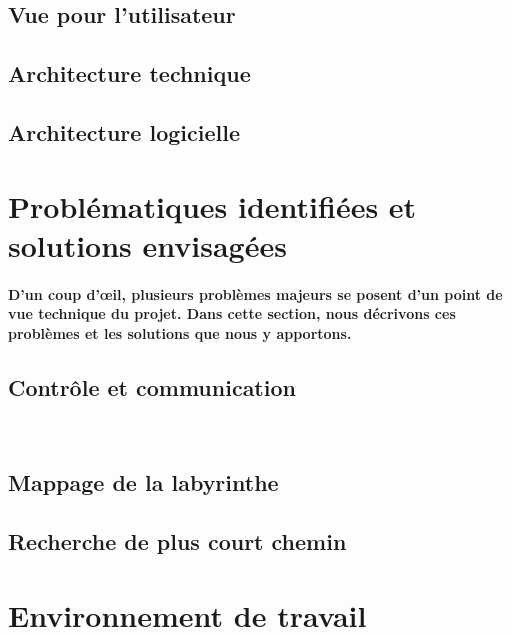 \subsection{Vue pour l’utilisateur} \label{subsec:vueUtil}

\subsection{Architecture technique} \label{subsec:archTechnique}

\subsection{Architecture logicielle} \label{subsec:vueLogicielle}



\section{Problématiques identifiées et solutions envisagées} \label{sec:problemesSolutions}

\paragraph{
   D'un coup d'œil, plusieurs problèmes majeurs se posent d'un point de vue technique du projet.
Dans cette section, nous décrivons ces problèmes et les solutions que nous y apportons.}

\subsection{Contrôle et communication} \label{subsec:ctrlComm}

\subsection{Mappage de la labyrinthe} \label{subsec:mapMaze}

\subsection{Recherche de plus court chemin} \label{subsec:rechChem}



\section{Environnement de travail} \label{sec:environnement}

